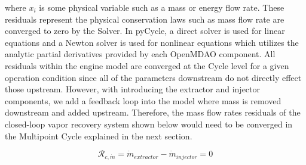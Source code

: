 \documentclass[conf]{new-aiaa}
\begin{document}
\noindent
where $x_i$ is some physical variable such as a mass or energy flow rate.
These residuals represent the physical conservation laws such as mass flow rate are converged to zero by the Solver.
In pyCycle, a direct solver is used for linear equations and a Newton solver is used for nonlinear equations which utilizes the analytic partial derivatives provided by each OpenMDAO component.
All residuals within the engine model are converged at the Cycle level for a given operation condition since all of the parameters downstream do not directly effect those upstream.
However, with introducing the extractor and injector components, we add a feedback loop into the model where mass is removed downstream and added upstream.
Therefore, the mass flow rates residuals of the closed-loop vapor recovery system shown below would need to be converged in the Multipoint Cycle explained in the next section.

\begin{equation}
    \mathcal{R}_{c,\dot{m}} = \dot{m}_{extractor} - \dot{m}_{injector} = 0
\end{equation}
\end{document}
